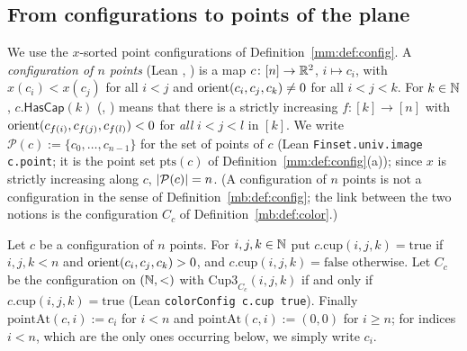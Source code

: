 \subsection{From configurations to points of the plane}\label{mb:ssec:bridge}

We use the $x$-sorted point configurations of Definition~\ref{mm:def:config}. A \emph{configuration of $n$ points}
(Lean , ) is a map
$c\colon[n]\to\mathbb R^2$, $i\mapsto c_i$, with $x(c_i)<x(c_j)$ for all $i<j$ and $\operatorname{orient}(c_i,c_j,c_k)\ne0$ for all
$i<j<k$. For $k\in\mathbb N$, $c.\mathsf{HasCap}(k)$ (, )
means that there is a strictly increasing $f\colon[k]\to[n]$ with $\operatorname{orient}(c_{f(i)},c_{f(j)},c_{f(l)})<0$ for \emph{all}
$i<j<l$ in $[k]$. We write $\mathcal P(c):=\{c_0,\dots,c_{n-1}\}$ for the set of points of $c$ (Lean
\texttt{Finset.univ.image c.point}; it is the point set $\mathrm{pts}(c)$ of Definition~\ref{mm:def:config}(a)); since
$x$ is strictly increasing along $c$, $\lvert\mathcal P(c)\rvert=n$. (A
configuration of $n$ points is not a configuration in the sense of Definition~\ref{mb:def:config}; the link between the
two notions is the configuration $C_c$ of Definition~\ref{mb:def:color}.)

\begin{definition}\label{mb:def:color}\raggedright
Let $c$ be a configuration of $n$ points. For $i,j,k\in\mathbb N$ put $c.\mathrm{cup}(i,j,k)=\mathrm{true}$ if $i,j,k<n$ and
$\operatorname{orient}(c_i,c_j,c_k)>0$, and $c.\mathrm{cup}(i,j,k)=\mathrm{false}$ otherwise. Let $C_c$ be the configuration on
$(\mathbb N,<)$ with $\mathrm{Cup3}_{C_c}(i,j,k)$ if and only if $c.\mathrm{cup}(i,j,k)=\mathrm{true}$ (Lean
\texttt{colorConfig c.cup true}). Finally $\mathrm{pointAt}(c,i):=c_i$ for $i<n$ and $\mathrm{pointAt}(c,i):=(0,0)$ for
$i\ge n$; for indices $i<n$, which are the only ones occurring below, we simply write $c_i$.
\end{definition}

